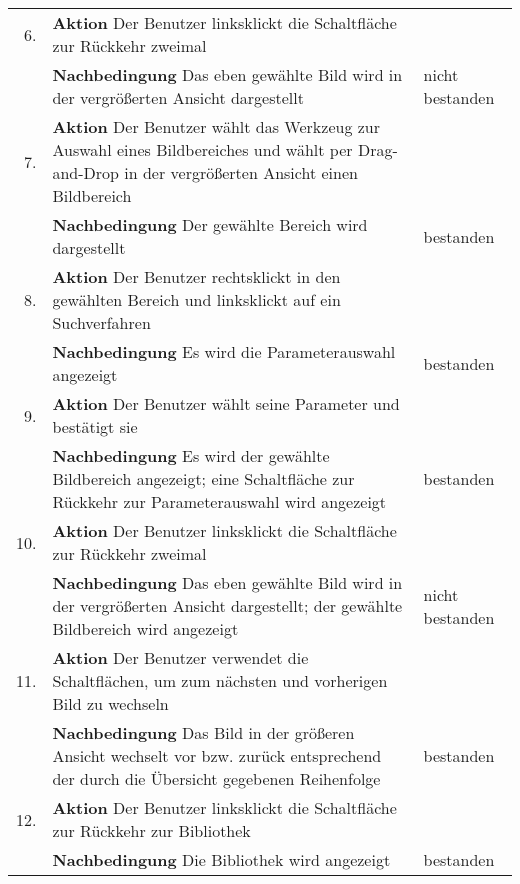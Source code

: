 \begin{enumerate} [label=\bfseries /TS \arabic*0/, leftmargin=*]
	\begin{tabular}{rp{4in}|l}
	6. & \textbf{Aktion} Der Benutzer linksklickt die Schaltfläche zur Rückkehr zweimal & \\
	   & \textbf{Nachbedingung}	Das eben gewählte Bild wird in der vergrößerten Ansicht dargestellt & nicht bestanden\\
	\hline
	7. & \textbf{Aktion} Der Benutzer wählt das Werkzeug zur Auswahl eines Bildbereiches und wählt per Drag-and-Drop in der vergrößerten Ansicht einen Bildbereich & \\
	   & \textbf{Nachbedingung} Der gewählte Bereich wird dargestellt & bestanden \\
	\hline	
	8. & \textbf{Aktion} Der Benutzer rechtsklickt in den gewählten Bereich und linksklickt auf ein Suchverfahren & \\
	   & \textbf{Nachbedingung} Es wird die Parameterauswahl angezeigt & bestanden \\
	\hline	
	9. & \textbf{Aktion} Der Benutzer wählt seine Parameter und bestätigt sie & \\
	   & \textbf{Nachbedingung} Es wird der gewählte Bildbereich angezeigt; eine Schaltfläche zur Rückkehr zur Parameterauswahl wird angezeigt & bestanden \\
	\hline   
   10. & \textbf{Aktion} Der Benutzer linksklickt die Schaltfläche zur Rückkehr zweimal & \\
	   & \textbf{Nachbedingung} Das eben gewählte Bild wird in der vergrößerten Ansicht dargestellt; der gewählte Bildbereich wird angezeigt & nicht bestanden \\
	\hline
   11. & \textbf{Aktion} Der Benutzer verwendet die Schaltflächen, um zum nächsten und vorherigen Bild zu wechseln & \\
	   & \textbf{Nachbedingung} Das Bild in der größeren Ansicht wechselt vor bzw. zurück entsprechend der durch die Übersicht gegebenen Reihenfolge & bestanden \\
	\hline
   12. & \textbf{Aktion} Der Benutzer linksklickt die Schaltfläche zur Rückkehr zur Bibliothek & \\
	   & \textbf{Nachbedingung} Die Bibliothek wird angezeigt & bestanden \\
	\end{tabular}
	\newline


\end{enumerate}
